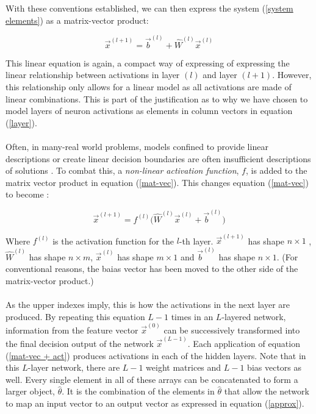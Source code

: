 \documentclass[12pt,letterpaper]{article}
\begin{document}
With these conventions established, we can then express the system (\ref{system elements}) as a matrix-vector product:

\begin{equation}
\label{mat-vec}
\vec{x}^{(l+1)} = \vec{b}^{(l)} + \hat{W}^{(l)} \vec{x}^{(l)}
\end{equation}

This linear equation is again, a compact way of expressing of expressing the linear relationship between activations in layer $(l)$ and layer $(l+1)$. However, this relationship only allows for a linear model as all activations are made of linear combinations. This is part of the justification as to why we have chosen to model layers of neuron activations as elements in column vectors in equation (\ref{layer}). 

\paragraph*{}Often, in many-real world problems, models confined to provide linear descriptions or create linear decision boundaries are often insufficient descriptions of solutions \cite{James}. To combat this, a \textit{non-linear activation function}, $f$, is added to the matrix vector product in equation (\ref{mat-vec}). This changes equation (\ref{mat-vec}) to become \cite{Goodfellow,Loy,Petrik} :

\begin{equation}
\label{mat-vec + act}
\vec{x}^{(l+1)} = f^{(l)} \Big( \hat{W}^{(l)} \vec{x}^{(l)} + \vec{b}^{(l)} \Big)
\end{equation}

Where $f^{(l)}$ is the activation function for the $l$-th layer. $\vec{x}^{(l+1)}$ has shape $n \times 1$ , $\hat{W}^{(l)}$ has shape $n \times m$, $\vec{x}^{(l)}$ has shape $m \times 1$ and $\vec{b}^{(l)}$ has shape $n \times 1$. (For conventional reasons, the baias vector has been moved to the other side of the matrix-vector product.) 

\paragraph*{}As the upper indexes imply, this is how the activations in the next layer are produced. By repeating this equation $L-1$ times in an 
$L$-layered network, information from the feature vector $\vec{x}^{(0)}$ can be successively transformed into the final decision output of the network $\vec{x}^{(L-1)}$. Each application of equation (\ref{mat-vec + act}) produces activations in each of the hidden layers. Note that in this $L$-layer network, there are $L-1$ weight matrices and $L-1$ bias vectors as well. Every single element in all of these arrays can be concatenated to form a larger object, $\hat{\theta}$. It is the combination of the elements in $\hat{\theta}$ that allow the network to map an input vector to an output vector as expressed in equation (\ref{approx}).
\end{document}
